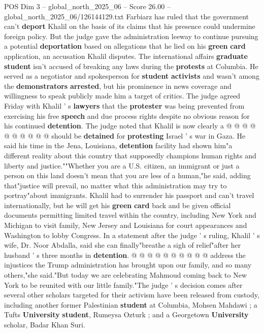\begin{textsample}{POS Dim 3 – global\_north\_2025\_06 – Score 26.00 – global\_north\_2025\_06/126144129.txt}
Farbiarz has ruled that the government can't \textbf{deport} Khalil on the basis of its claims that his presence could undermine foreign policy.
But the judge gave the administration leeway to continue pursuing a potential \textbf{deportation} based on allegations that he lied on his \textbf{green} \textbf{card} application, an accusation Khalil disputes.
The international affairs \textbf{graduate} \textbf{student} isn't accused of breaking any laws during the \textbf{protests} at Columbia.
He served as a negotiator and spokesperson for \textbf{student} \textbf{activists} and wasn't among the \textbf{demonstrators} \textbf{arrested}, but his prominence in news coverage and willingness to speak publicly made him a target of critics.
The judge agreed Friday with Khalil ' s \textbf{lawyers} that the \textbf{protester} was being prevented from exercising his free \textbf{speech} and due process rights despite no obvious reason for his continued \textbf{detention}.
The judge noted that Khalil is now clearly a @ @ @ @ @ @ @ @ @ @ should be \textbf{detained} for \textbf{protesting} Israel ' s war in Gaza.
He said his time in the Jena, Louisiana, \textbf{detention} facility had shown him"a different reality about this country that supposedly champions human rights and liberty and justice.""Whether you are a U.S. citizen, an immigrant or just a person on this land doesn't mean that you are less of a human,"he said, adding that"justice will prevail, no matter what this administration may try to portray"about immigrants.
Khalil had to surrender his passport and can't travel internationally, but he will get his \textbf{green} \textbf{card} back and be given official documents permitting limited travel within the country, including New York and Michigan to visit family, New Jersey and Louisiana for court appearances and Washington to lobby Congress.
In a statement after the judge ' s ruling, Khalil ' s wife, Dr.
Noor Abdalla, said she can finally"breathe a sigh of relief"after her husband ' s three months in \textbf{detention}. @ @ @ @ @ @ @ @ @ @ address the injustices the Trump administration has brought upon our family, and so many others,"she said."But today we are celebrating Mahmoud coming back to New York to be reunited with our little family."The judge ' s decision comes after several other scholars targeted for their activism have been released from custody, including another former Palestinian \textbf{student} at Columbia, Mohsen Mahdawi ; a Tufts \textbf{University} \textbf{student}, Rumeysa Ozturk ; and a Georgetown \textbf{University} scholar, Badar Khan Suri.

\end{textsample}
